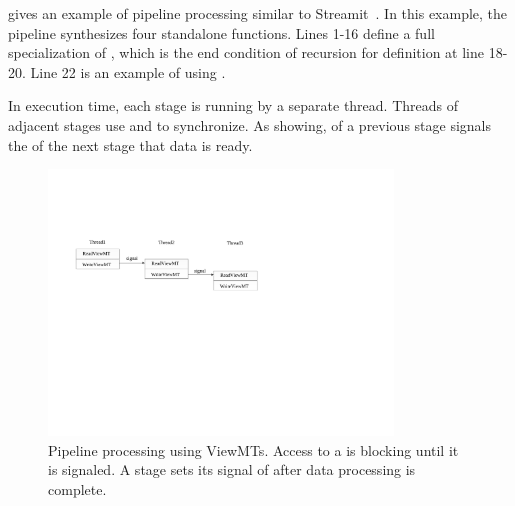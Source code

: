  gives an example of pipeline processing similar to Streamit~\cite{ThiesKA02}.
In this example, the pipeline synthesizes four standalone functions.
Lines 1-16 define a full specialization of , which is the end
condition of recursion for definition  at line 18-20.
Line 22 is an example of using . 

In execution time, each stage is running by a separate thread. Threads of
adjacent stages use  and  to synchronize.
As  showing,  of a previous stage signals the
 of the next stage that data is ready.



\begin{figure}[tp]
  \includegraphics[width=3.6in]{../viewmt}
  \caption{Pipeline processing using ViewMTs. Access to a  is
  blocking until it is signaled. A stage sets its signal of 
after data processing is complete.}
  \label{fig:viewmt}
\end{figure}

